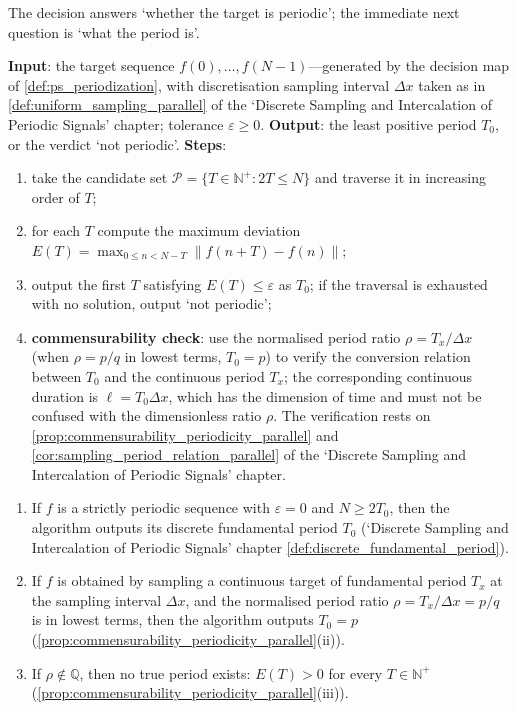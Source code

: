 The decision answers `whether the target is periodic'; the immediate next question is `what the period is'.

\begin{definition}\label{def:ps_minimal_period_algorithm}
\textbf{Input}: the target sequence $f(0),\dots,f(N-1)$---generated by the decision map of \cref{def:ps_periodization}, with discretisation sampling interval $\Delta x$ taken as in \cref{def:uniform_sampling_parallel} of the `Discrete Sampling and Intercalation of Periodic Signals' chapter; tolerance $\varepsilon\ge0$.
\textbf{Output}: the least positive period $T_0$, or the verdict `not periodic'.
\textbf{Steps}:
\begin{enumerate}[label=(\arabic*)]
    \item take the candidate set $\mathcal{P}=\{T\in\mathbb{N}^+:2T\le N\}$ and traverse it in increasing order of $T$;
    \item for each $T$ compute the maximum deviation $E(T)=\max_{0\le n<N-T}\|f(n+T)-f(n)\|$;
    \item output the first $T$ satisfying $E(T)\le\varepsilon$ as $T_0$; if the traversal is exhausted with no solution, output `not periodic';
    \item \textbf{commensurability check}: use the normalised period ratio $\rho=T_x/\Delta x$ (when $\rho=p/q$ in lowest terms, $T_0=p$) to verify the conversion relation between $T_0$ and the continuous period $T_x$; the corresponding continuous duration is $\ell=T_0\Delta x$, which has the dimension of time and must not be confused with the dimensionless ratio $\rho$. The verification rests on \cref{prop:commensurability_periodicity_parallel} and \cref{cor:sampling_period_relation_parallel} of the `Discrete Sampling and Intercalation of Periodic Signals' chapter.
\end{enumerate}
\end{definition}

\begin{theorem}\label{thm:ps_minimal_period_correctness}
\begin{enumerate}[label=(\roman*)]
    \item If $f$ is a strictly periodic sequence with $\varepsilon=0$ and $N\ge2T_0$, then the algorithm outputs its discrete fundamental period $T_0$ (`Discrete Sampling and Intercalation of Periodic Signals' chapter \cref{def:discrete_fundamental_period}).
    \item If $f$ is obtained by sampling a continuous target of fundamental period $T_x$ at the sampling interval $\Delta x$, and the normalised period ratio $\rho=T_x/\Delta x=p/q$ is in lowest terms, then the algorithm outputs $T_0=p$ (\cref{prop:commensurability_periodicity_parallel}(ii)).
    \item If $\rho\notin\mathbb{Q}$, then no true period exists: $E(T)>0$ for every $T\in\mathbb{N}^+$ (\cref{prop:commensurability_periodicity_parallel}(iii)).
\end{enumerate}
\end{theorem}

